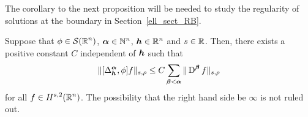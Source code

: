 
The corollary to the next proposition will be needed to study the
regularity of solutions at the boundary in Section~\ref{ell_sect_RB}.

\begin{prop} \label{ell_reg_prop4}
Suppose that $\displaystyle \phi \in \mathcal{S}(\mathbb{R}^n)$,
$\displaystyle {\bm{\alpha}} \in \mathbb{N}^n$, $\displaystyle {\bm{h}}\in \mathbb{R}^n$
and $s \in \mathbb{R}$.  Then,
there exists a positive constant $C$ independent of ${\bm{h}}$ such that
\begin{equation} \label{ellRegProp4Eq1}
\| [\Delta^{{\bm{\alpha}}}_{{\bm{h}}}, \phi] f \|_{s,\rho} \leq C
\sum_{{\bm{\beta}}<{\bm{\alpha}}} \| \operatorname{D}^{{\bm{\beta}}} f\|_{s,\rho}
\end{equation}
for all $\displaystyle f \in H^{s,2}(\mathbb{R}^n)$.
The possibility that the right hand side be $\infty$ is not ruled out.
\end{prop}

